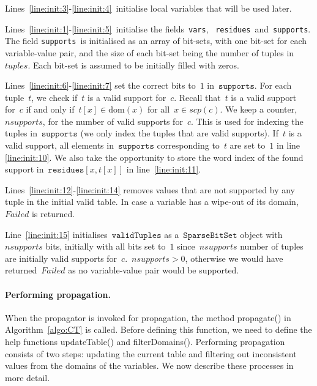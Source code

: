\documentclass[a4paper,11pt]{article}
\newcommand{\Algoref}[1]{Algorithm~\ref{#1}}
\newcommand{\Lineref}[1]{Line~\ref{#1}}
\newcommand{\Linesref}[2]{Lines~\ref{#1}-\ref{#2}}
\newcommand{\Dom}[1]{\text{dom}({#1})}
\newcommand{\SparseBitSet}{\texttt{SparseBitSet}}
\newcommand{\Scp}{\texttt{vars}}
\newcommand{\CurrTable}{\texttt{validTuples}}
\newcommand{\Supports}{\texttt{supports}}
\newcommand{\Residues}{\texttt{residues}}
\newcommand{\localvar}[1]{\mathit{#1}}
\numberwithin{equation}{section}
\begin{document}
\Linesref{line:init:3}{line:init:4}~initialise local variables that will be 
used later.

\Linesref{line:init:1}{line:init:5}~initialise the fields~\Scp,
~\Residues~and~\Supports.
The field \Supports~is initialised as an array of bit-sets, with one bit-set for each
variable-value pair, and the size of each
bit-set being the number of tuples in~$\localvar{tuples}$. Each bit-set is assumed
to be initially filled with zeros.

\Linesref{line:init:6}{line:init:7} set the correct bits to~$1$ in~$\Supports$.
For each tuple~$t$, we check if~$t$ is a valid support for~$c$. Recall that~$t$ is
a valid support for~$c$ if and only if~$t[x] \in \Dom{x}$ for all~$x \in scp(c)$.
We keep a counter,~$nsupports$, for the number of valid supports for~$c$.
This is used for indexing the tuples in~$\Supports$ (we only index the tuples
that are valid supports).
If~$t$ is a valid support,
all elements in~$\Supports$ corresponding to~$t$ are set to~$1$ in
line \ref{line:init:10}. We also take the opportunity to store the word index
of the found support in~$\Residues[x,t[x]]$
in line~\ref{line:init:11}.

\Linesref{line:init:12}{line:init:14} removes values that are not supported
by any tuple in the initial valid table. In case a variable has a wipe-out
of its domain,~$Failed$ is returned.

\Lineref{line:init:15} initialises~$\CurrTable$ as a~$\SparseBitSet$ object with
$nsupports$ bits, initially with all bits set to~$1$ since~$nsupports$
number of tuples are initially valid supports for~$c$.~$\localvar{nsupports} > 0$,
otherwise we would have returned~$Failed$ as no variable-value pair would be
supported.

\paragraph{Performing propagation.}
When the propagator is invoked for propagation, the method propagate()
in \Algoref{algo:CT} is called. Before defining this function, we need
to define the help functions updateTable() and filterDomains().
Performing propagation consists of two steps: updating the current
table and filtering out inconsistent values from the domains of the variables.
We now describe these processes in more detail.
\end{document}
